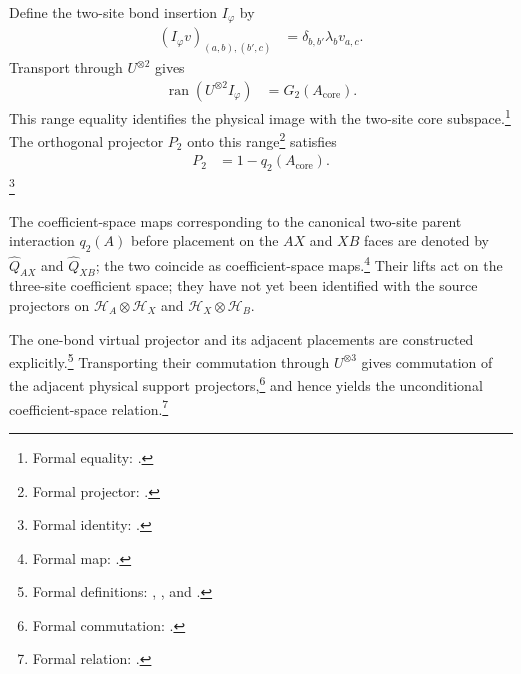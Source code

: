 \documentclass{article}
\begin{document}
Define the two-site bond insertion $I_\varphi$ by
\begin{align}
    (I_\varphi v)_{(a,b),(b',c)}
        &=\delta_{b,b'}\lambda_b v_{a,c}.
    \label{eq:cpsv16_nncph_ground_state_scope_bond_insertion}
\end{align}
Transport through $U^{\otimes2}$ gives
\begin{align}
    \operatorname{ran}(U^{\otimes2}I_\varphi)
        &=G_2(A_{\mathrm{core}}).
    \label{eq:cpsv16_nncph_ground_state_scope_two_site_range}
\end{align}
This range equality identifies the physical image with the two-site core
subspace.\footnote{Formal equality:
.} The
orthogonal projector $P_2$ onto this range\footnote{Formal projector:
.}
satisfies
\begin{align}
    P_2
        &=1-q_2(A_{\mathrm{core}}).
    \label{eq:cpsv16_nncph_ground_state_scope_support_projection_complement}
\end{align}
\footnote{Formal identity:
.}

The coefficient-space maps corresponding to the canonical two-site parent
interaction $q_2(A)$ before placement on the $AX$ and $XB$ faces are denoted by
$\widehat Q_{AX}$ and $\widehat Q_{XB}$; the two coincide as coefficient-space
maps.\footnote{Formal map:
.} Their
lifts act on the three-site coefficient space; they have not yet been identified
with the source projectors on $\mathcal H_A\otimes\mathcal H_X$ and $\mathcal
H_X\otimes\mathcal H_B$.

The one-bond virtual projector and its adjacent placements are constructed
explicitly.\footnote{Formal definitions:
,
, and
.}
Transporting their commutation through $U^{\otimes3}$ gives commutation of the
adjacent physical support projectors,\footnote{Formal commutation:
.}
and hence yields the unconditional coefficient-space relation.\footnote{Formal
relation:
.}
\end{document}
